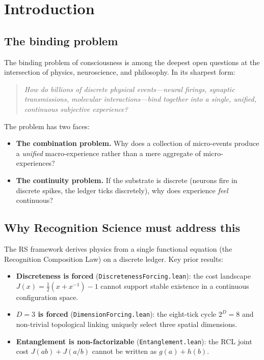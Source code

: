 \documentclass[11pt,a4paper]{article}
\theoremstyle{plain}
\theoremstyle{definition}
\theoremstyle{remark}
\newcommand{\Jcost}{J}
\begin{document}
\section{Introduction}
\label{sec:intro}

\subsection{The binding problem}

The binding problem of consciousness is among the deepest open
questions at the intersection of physics, neuroscience, and
philosophy.  In its sharpest form:

\begin{quote}
\itshape
How do billions of discrete physical events---neural firings, synaptic
transmissions, molecular interactions---bind together into a single,
unified, continuous subjective experience?
\end{quote}

The problem has two faces:
\begin{itemize}[nosep]
\item \textbf{The combination problem.}  Why does a collection of
  micro-events produce a \emph{unified} macro-experience rather than a
  mere aggregate of micro-experiences?
\item \textbf{The continuity problem.}  If the substrate is discrete
  (neurons fire in discrete spikes, the ledger ticks discretely), why
  does experience \emph{feel} continuous?
\end{itemize}

\subsection{Why Recognition Science must address this}

The RS framework derives physics from a single functional equation (the
Recognition Composition Law) on a discrete ledger.  Key prior results:
\begin{itemize}[nosep]
\item \textbf{Discreteness is forced}
  (\texttt{DiscretenessForcing.lean}): the cost landscape
  $\Jcost(x) = \tfrac12(x + x^{-1}) - 1$ cannot support stable
  existence in a continuous configuration space.
\item \textbf{$D = 3$ is forced} (\texttt{DimensionForcing.lean}):
  the eight-tick cycle $2^D = 8$ and non-trivial topological linking
  uniquely select three spatial dimensions.
\item \textbf{Entanglement is non-factorizable}
  (\texttt{Entanglement.lean}): the RCL joint cost
  $\Jcost(ab) + \Jcost(a/b)$ cannot be written as $g(a) + h(b)$.
\end{itemize}
\end{document}
